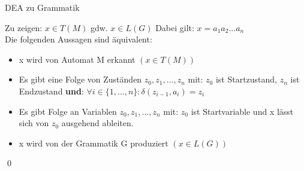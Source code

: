 %            

\begin{frame}{DEA zu Grammatik}
    \begin{alertblock}{Zu zeigen: $x \in T(M)$ gdw. $x \in L(G)$}
    Dabei gilt: $x=a_1 a_2 ... a_n$\\
    Die folgenden Aussagen sind äquivalent:
        \begin{itemize}
            \item x wird von Automat M erkannt \emph{$(x\in T(M))$}
            \item Es gibt eine Folge von Zuständen $z_0, z_1, \dots, z_n$ mit: $z_0$ ist Startzustand, $z_n$ ist Endzustand \textbf{und}: $\forall i \in \{1, ..., n\}: \delta(z_{i-1}, a_i)=z_i$
            \item Es gibt Folge an Variablen $z_0, z_1, \dots, z_n$ mit: $z_0$ ist Startvariable und x lässt sich von $z_0$ ausgehend ableiten.
            \item x wird von der Grammatik G produziert \emph{$(x \in L(G))$}
        \end{itemize}
        \qed
    \end{alertblock}
\end{frame}

